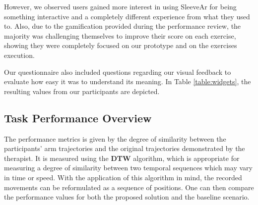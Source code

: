 However, we observed users gained more interest in using SleeveAr for being something interactive and a completely different experience from what they used to.
Also, due to the gamification provided during the performance review, the majority was challenging themselves to improve their score on each exercise, showing they were completely focused on our prototype and on the exercises execution.

Our questionnaire also included questions regarding our visual feedback to evaluate how easy it was to understand its meaning. 
In Table \ref{table:widgets}, the resulting values from our participants are depicted. 




\begin{table}[!t]
\centering
{}
\caption{Widgets Questionnaire}
\label{table:widgets}
\end{table}

\subsection{Task Performance Overview}




















The performance metrics is given by the degree of similarity between the participants' arm trajectories and the original trajectories demonstrated by the therapist. 
It is measured using the \textbf{\ac{DTW}}  algorithm, which is appropriate for measuring a degree of similarity between two temporal sequences which may vary in time or speed. 
With the application of this algorithm in mind, the recorded movements can be reformulated as a sequence of positions. One can then compare the performance values for both the proposed solution and the baseline scenario.

